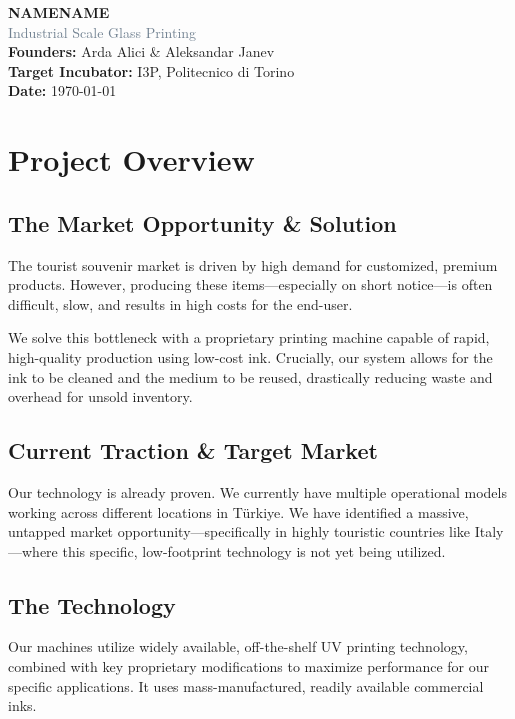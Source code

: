 \documentclass[11pt, a4paper]{article}
\begin{document}
\begin{flushleft}
    {\Huge \textbf{\textcolor{TechBlue}{NAMENAME}}} \\[0.3cm]
    {\Large \textcolor{SlateGray}{Industrial Scale Glass Printing}} \\[0.5cm]
    \textbf{Founders:} Arda Alici \& Aleksandar Janev \\
    \textbf{Target Incubator:} I3P, Politecnico di Torino \\
    \textbf{Date:} \today
\end{flushleft}
\vspace{0.8cm}

\section*{Project Overview}

\subsection*{The Market Opportunity \& Solution}
The tourist souvenir market is driven by high demand for customized, premium products. However, producing these items—especially on short notice—is often difficult, slow, and results in high costs for the end-user.

We solve this bottleneck with a proprietary printing machine capable of rapid, high-quality production using low-cost ink. Crucially, our system allows for the ink to be cleaned and the medium to be reused, drastically reducing waste and overhead for unsold inventory.

\subsection*{Current Traction \& Target Market}
Our technology is already proven. We currently have multiple operational models working across different locations in Türkiye. We have identified a massive, untapped market opportunity—specifically in highly touristic countries like Italy—where this specific, low-footprint technology is not yet being utilized.

\subsection*{The Technology}
Our machines utilize widely available, off-the-shelf UV printing technology, combined with key proprietary modifications to maximize performance for our specific applications. It uses mass-manufactured, readily available commercial inks.
\end{document}
